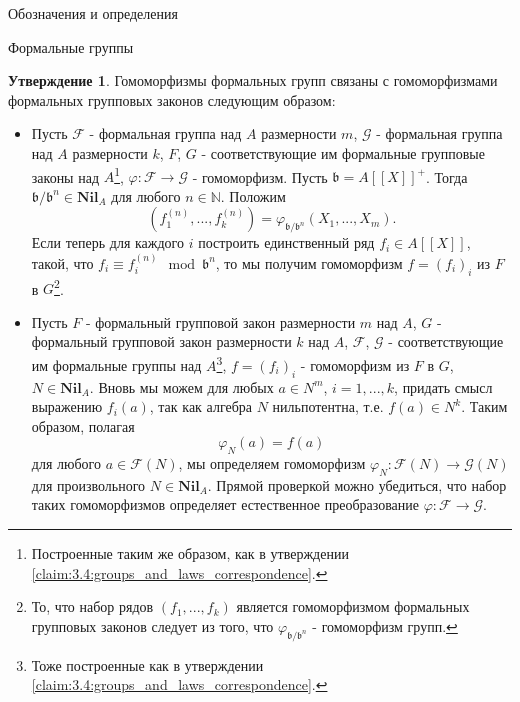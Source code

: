\documentclass[a4paper,14pt]{extarticle}
\theoremstyle{definition}
\newtheorem{claim}[theorem]{Утверждение}
\newcommand{\Nil}[1]{\mathbf{Nil}_{#1}}
\newcommand{\bN}{\mathbb{N}}
\newcommand{\fb}{\mathfrak{b}}
\newcommand{\sF}{\mathscr{F}}
\newcommand{\sG}{\mathscr{G}}
\begin{document}
\begin{section}{Обозначения и определения}
\begin{subsection}{Формальные группы}
\begin{claim}\label{claim:3.5:group_and_law_homs_correspondence}
    Гомоморфизмы формальных групп связаны с гомоморфизмами формальных групповых законов следующим образом:
    \begin{itemize}
        \item Пусть $\sF$ - формальная группа над $A$ размерности $m$, $\sG$ - формальная группа над $A$ размерности $k$, $F$, $G$ - соответствующие им формальные групповые законы над $A$\footnote{
            Построенные таким же образом, как в утверждении \ref{claim:3.4:groups_and_laws_correspondence}.
        }, ${ \varphi : \sF \rightarrow \sG }$ - гомоморфизм. Пусть ${ \fb = A[[X]]^+ }$. Тогда ${ \fb / \fb^n \in \Nil{A} }$ для любого ${ n \in \bN }$. Положим
        \begin{equation*}
            \left(
                f_1^{(n)}, ..., f_k^{(n)}
            \right) =
            \varphi_{\fb / \fb^n} (X_1, ..., X_m).
        \end{equation*}
        Если теперь для каждого $i$ построить единственный ряд ${ f_i \in A[[X]] }$, такой, что ${ f_i \equiv f_i^{(n)} \mod \fb^n }$, то мы получим гомоморфизм ${ f = (f_i)_i }$ из $F$ в $G$\footnote{
            То, что набор рядов ${ (f_1, ..., f_k) }$ является гомоморфизмом формальных групповых законов следует из того, что $\varphi_{\fb / \fb^n}$ - гомоморфизм групп.
        }.
        \item Пусть $F$ - формальный групповой закон размерности $m$ над $A$, $G$ - формальный групповой закон размерности $k$ над $A$, $\sF$, $\sG$ - соответствующие им формальные группы над $A$\footnote{
            Тоже построенные как в утверждении \ref{claim:3.4:groups_and_laws_correspondence}.
        }, ${ f = (f_i)_i }$ - гомоморфизм из $F$ в $G$, ${ N \in \Nil{A} }$. Вновь мы можем для любых ${ a \in N^m }$, ${ i = 1, ..., k }$, придать смысл выражению ${ f_i(a) }$, так как алгебра $N$ нильпотентна, т.е. ${ f(a) \in N^k }$. Таким образом, полагая
        \begin{equation*}
            \varphi_N(a) = f(a)
        \end{equation*}
        для любого ${ a \in \sF(N) }$, мы определяем гомоморфизм ${ \varphi_N : \sF(N) \rightarrow \sG(N) }$ для произвольного ${ N \in \Nil{A} }$. Прямой проверкой можно убедиться, что набор таких гомоморфизмов определяет естественное преобразование ${ \varphi : \sF \rightarrow \sG }$.
    \end{itemize}
\end{claim}


\end{subsection}
\end{section}
\end{document}
